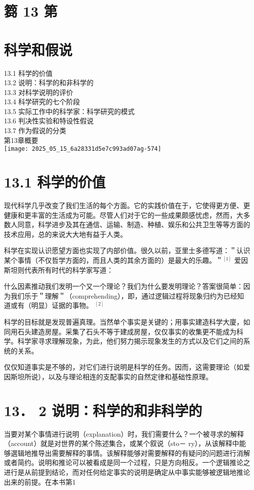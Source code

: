 \section*{篘 13 第}
\section*{科学和假说}
13.1 科学的价值\\
13.2 说明：科学的和非科学的\\
13.3 对科学说明的评价\\
13.4 科学研究的七个阶段\\
13.5 实际工作中的科学家：科学研究的模式\\
13.6 判决性实验和特设性假说\\
13.7 作为假说的分类\\
第13章概要\\
\texttt{[image: 2025\_05\_15\_6a28331d5e7c993ad07ag-574]}

\section*{13.1 科学的价值}
现代科学几乎改变了我们生活的每个方面。它的实践价值在于，它使得更方便、更健康和更丰富的生活成为可能。尽管人们对于它的一些成果颇感忧虑，然而，大多数人同意，科学进步及其在通信、运输、制造、种植、娱乐和公共卫生等等方面的技术应用，总的来说大大地有益于人类。

科学在实现认识愿望方面也实现了内部价值。很久以前，亚里士多德写道：＂认识某个事情（不仅哲学方面的，而且人类的其余方面的）是最大的乐趣。＂${ }^{[1]}$ 爱因斯坦则代表所有时代的科学家写道：

\begin{displayquote}
什么因素推动我们发明一个又一个理论？我们为什么要发明理论？答案很简单：因为我们乐于＂理解＂（comprehending），即，通过逻辑过程将现象归约为已经知道或有（明显）证据的事物。 ${ }^{[2]}$
\end{displayquote}

科学的目标就是发现普遍真理。当然单个事实是关键的；用事实建造科学大廈，如同用石头建造房屋。采集了石头不等于建成房屋，仅仅事实的收集更不能成为科学。科学家寻求理解现象，为此，他们努力揭示现象发生的方式以及它们之间的系统的关系。

仅仅知道事实是不够的，对它们进行说明是科学的任务。因而，这需要理论（如爱因斯坦所说），以及与理论相连的支配事实的自然定律和基础性原理。

\section*{13． 2 说明：科学的和非科学的}
当要对某个事情进行说明（explanation）时，我们需要什么？一个被寻求的解释（account）就是对世界的某个陈述集合，或某个叙说（sto－ ry），从该解释中能够選辑地推导出需要解释的事情。该解释能够对需要解释的有疑问的问题进行消解或者简约。说明和推论可以被看成是同一个过程，只是方向相反。一个逻辑推论之进行是从前提到结论，而对任何给定事实的说明是确定从中事实能够被逻辑地推论出来的前提。在本书第1


